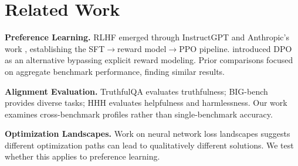 \section{Related Work}

\textbf{Preference Learning.} RLHF emerged through InstructGPT \citep{ouyang2022training} and Anthropic's work \citep{bai2022training}, establishing the SFT$\rightarrow$reward model$\rightarrow$PPO pipeline. \citet{rafailov2023direct} introduced DPO as an alternative bypassing explicit reward modeling. Prior comparisons focused on aggregate benchmark performance, finding similar results.

\textbf{Alignment Evaluation.} TruthfulQA \citep{lin2022truthfulqa} evaluates truthfulness; BIG-bench \citep{srivastava2023beyond} provides diverse tasks; HHH evaluates helpfulness and harmlessness. Our work examines cross-benchmark profiles rather than single-benchmark accuracy.

\textbf{Optimization Landscapes.} Work on neural network loss landscapes \citep{li2018visualizing} suggests different optimization paths can lead to qualitatively different solutions. We test whether this applies to preference learning.
